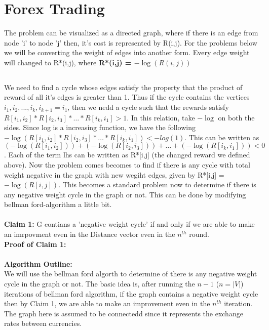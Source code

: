 \documentclass{article}
\begin{document}
\section{Forex Trading}
The problem can be visualized as a directed graph, where if there is an edge from node 'i' to node 'j' then, it's cost is represented by R(i,j). For the problems below we will be converting the weight of edges into another form. Every edge weight will changed to R*(i,j), where \textbf{R*(i,j) = $-\log{(R(i,j))}$}

\subsection{} 

We need to find a cycle whose edges satisfy the property that the product of reward of all it's edges is greater than 1. Thus if the cycle contains the vertices $i_1, i_2, ..., i_k, i_{k+1} = i_1 $, then we nedd a cycle such that the rewards satisfy $R[i_1, i_2]*R[i_2, i_3]* \dots * R[i_k, i_1] > 1$. In this relation, take $-\log$ on both the sides. Since log is a increasing function, we have the following $-\log{(R[i_1, i_2]*R[i_2, i_3]* \dots * R[i_k, i_1])} < -log{(1)}$. This can be written as $(-\log{(R[i_1, i_2])}) + (-\log{(R[i_2, i_3])}) + \dots + (-\log{(R[i_k, i_1])}) < 0$. Each of the term lhs can be written as R*[i,j] (the changed reward we defined above). Now the problem comes becomes to find if there is any cycle with total weight negative in the graph with new wegiht edges, given by R*[i,j] = $-\log{(R[i,j])}$. This becomes a standard problem now to determine if there is any negative weight cycle in the graph or not. This can be done by modifying bellman ford-algorithm a little bit. 
\\\\
\textbf{Claim 1:} G contians a 'negative weight cycle' if and only if we are able to make an imrpovment even in the Distance vector even in the $n^{th}$ round.\\
\textbf{Proof of Claim 1:} 
\\\\
\textbf{Algorithm Outline:}\\
We will use the bellman ford algorth to determine of there is any negative weight cycle in the graph or not. The basic idea is, after running the $n-1$ ($n = |V|$) iterations of bellman ford algorithm, if the graph contains a negative weight cycle then by Claim 1, we are able to make an improvement even in the $n^{th}$ iteration. The graph here is assumed to be connectedd since it represents the exchange rates between currencies.
\end{document}

